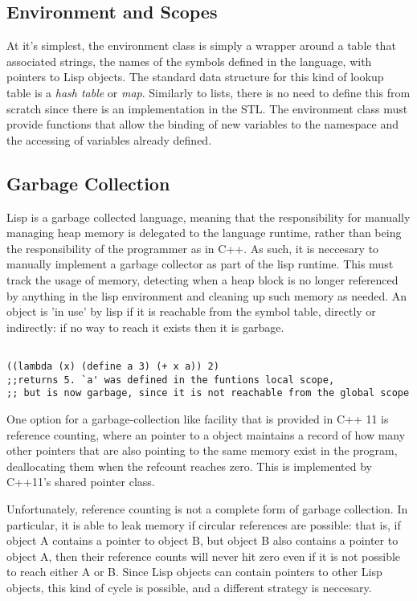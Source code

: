 \documentclass[12pt]{article}
\begin{document}

\subsection{Environment and Scopes} 
At it's simplest, the environment class is simply a wrapper around a table that associated strings, the names of the symbols defined in the language, with pointers
to Lisp objects. The standard data structure for this kind of lookup table is a \textit{hash table} or \textit{map}. Similarly to lists, there is no need to define this 
from scratch since there is an implementation in the STL. The environment class must provide functions that allow the 
binding of new variables to the namespace and the accessing of variables already defined. 

\subsection{Garbage Collection} 

Lisp is a garbage collected language, meaning that the responsibility for manually managing heap memory is delegated to the language runtime, rather than 
being the responsibility of the programmer as in C++. As such, it is neccesary to manually implement a garbage collector as part of the lisp runtime. This must 
track the usage of memory, detecting when a heap block is no longer referenced by anything in the lisp environment and cleaning up such memory as needed. 
An object is 'in use' by lisp if it is reachable from the symbol table, directly or indirectly: if no way to reach it exists then it is garbage. 

\begin{lstlisting}

((lambda (x) (define a 3) (+ x a)) 2) 
;;returns 5. `a' was defined in the funtions local scope,
;; but is now garbage, since it is not reachable from the global scope

\end{lstlisting}

One option for a garbage-collection like facility that is provided in C++ 11 is reference counting, where an pointer to a object maintains a record of how many 
other pointers that are also pointing to the same memory exist in the program, deallocating them when the refcount reaches zero. This is implemented by C++11's 
shared pointer class. 

Unfortunately, reference counting is not a complete form of garbage collection. In particular, it is able to leak memory if circular references are possible: that is, 
if object A contains a pointer to object B, but object B also contains a pointer to object A, then their reference counts will never hit zero even if it is not possible 
to reach either A or B. Since Lisp objects can contain pointers to other Lisp objects, this kind of cycle is possible, and a different strategy is neccesary. 
\end{document}
